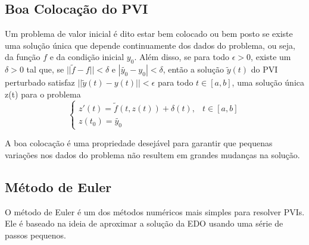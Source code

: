 \subsection{Boa Colocação do PVI}
Um problema de valor inicial é dito estar bem colocado ou bem posto se existe
uma solução única que depende continuamente dos dados do problema, ou seja, da
função $f$ e da condição inicial $y_0$. Além disso, se para todo $\epsilon >
    0$, existe um $\delta > 0$ tal que, se $||\tilde{f} - f|| < \delta$ e
$|\tilde{y_0} - y_0| < \delta$, então a solução $\tilde{y}(t)$ do PVI
perturbado satisfaz $||\tilde{y}(t) - y(t)|| < \epsilon$ para todo $t \in [a,
        b]$, uma solução única z(t) para o problema
\begin{equation}
    \begin{cases}
        z'(t) = \tilde{f}(t, z(t)) + \delta(t) , & t \in [a, b] \\
        z(t_0) = \tilde{y_0}
    \end{cases}
\end{equation}

A boa colocação é uma propriedade desejável para garantir que pequenas
variações nos dados do problema não resultem em grandes mudanças na solução.

\subsection{Método de Euler}
O método de Euler é um dos métodos numéricos mais simples para resolver PVIs.
Ele é baseado na ideia de aproximar a solução da EDO usando uma série de passos
pequenos.


